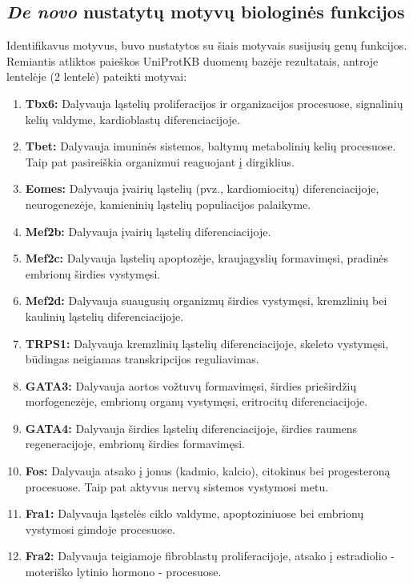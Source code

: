 \documentclass[12pt]{article}
\begin{document}
\subsection{\emph{De novo} nustatytų motyvų biologinės funkcijos}
Identifikavus motyvus, buvo nustatytos su šiais motyvais susijusių genų
funkcijos. Remiantis atliktos paieškos UniProtKB\cite{UNIPROTKB} duomenų
bazėje rezultatais, antroje lentelėje (2 lentelė) pateikti motyvai:

\begin{enumerate}
    \item \textbf{Tbx6:} Dalyvauja ląstelių proliferacijos ir organizacijos
        procesuose, signalinių kelių valdyme, kardioblastų diferenciacijoje.
    \item \textbf{Tbet:} Dalyvauja imuninės sistemos, baltymų metabolinių
        kelių procesuose. Taip pat pasireiškia organizmui reaguojant į
        dirgiklius.
    \item \textbf{Eomes:} Dalyvauja įvairių ląstelių (pvz.,
        kardiomiocitų) diferenciacijoje, neurogenezėje, kamieninių ląstelių
        populiacijos palaikyme.
    \item \textbf{Mef2b:} Dalyvauja įvairių ląstelių diferenciacijoje.
    \item \textbf{Mef2c:} Dalyvauja ląstelių apoptozėje, kraujagyslių
        formavimęsi, pradinės embrionų širdies vystymęsi.
    \item \textbf{Mef2d:} Dalyvauja suaugusių organizmų širdies vystymęsi,
        kremzlinių bei kaulinių ląstelių diferenciacijoje.
    \item \textbf{TRPS1:} Dalyvauja kremzlinių ląstelių diferenciacijoje,
        skeleto vystymęsi, būdingas neigiamas transkripcijos reguliavimas.
    \item \textbf{GATA3:} Dalyvauja aortos vožtuvų formavimęsi, širdies
        prieširdžių morfogenezėje, embrionų organų vystymęsi, eritrocitų
        diferenciacijoje.
    \item \textbf{GATA4:} Dalyvauja širdies ląstelių diferenciacijoje,
        širdies raumens regeneracijoje, embrionų širdies formavimęsi.
    \item \textbf{Fos:} Dalyvauja atsako į jonus (kadmio, kalcio),
        citokinus bei progesteroną procesuose. Taip pat aktyvus nervų sistemos
        vystymosi metu.
    \item \textbf{Fra1:} Dalyvauja ląstelės ciklo valdyme, apoptoziniuose
        bei embrionų vystymosi gimdoje procesuose.
    \item \textbf{Fra2:} Dalyvauja teigiamoje fibroblastų proliferacijoje,
        atsako į estradiolio - moteriško lytinio hormono - procesuose.
\end{enumerate}
\end{document}
